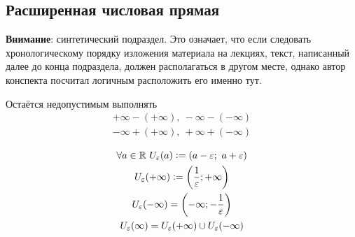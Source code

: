 \subsection{Расширенная числовая прямая}
\textbf{Внимание}: синтетический подраздел. Это означает, что если следовать хронологическому порядку изложения материала на лекциях, текст, написанный далее до конца подраздела, должен располагаться в другом месте, однако автор конспекта посчитал логичным расположить его именно тут.


\begin{note}
    Остаётся недопустимым выполнять
    \begin{gather*}
        + \infty - ( + \infty), \ - \infty - ( - \infty) \\
        - \infty + ( + \infty), \  + \infty + ( - \infty)
    \end{gather*}
\end{note}

\begin{equation}
    \begin{gathered}
        \forall a \in \mathbb{R}\ U_{\varepsilon}(a) \vcentcolon= (a - \varepsilon;\ a + \varepsilon) \\
        U_{\varepsilon}( + \infty) \vcentcolon= \left(\frac{1}{\varepsilon}; + \infty\right) \\
        U_{\varepsilon}( -\infty) = \left( - \infty; - \frac{1}{\varepsilon}\right) \\
        U_{\varepsilon}(\infty) = U_\varepsilon(+\infty) \cup U_\varepsilon(-\infty)
    \end{gathered}
\end{equation}

